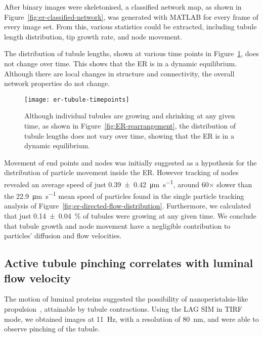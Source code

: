 After binary images were skeletonised, a classified network map, as shown in Figure~\ref{fig:er-classified-network}, was generated with MATLAB for every frame of every image set.
From this, various statistics could be extracted, including tubule length distribution, tip growth rate, and node movement.

The distribution of tubule lengths, shown at various time points in Figure~\ref{fig:er-tubule-timepoints}, does not change over time.
This shows that the ER is in a dynamic equilibrium.
Although there are local changes in structure and connectivity, the overall network properties do not change.

\begin{figure}[b!]
\centering
\texttt{[image: er-tubule-timepoints]}
\caption[ER: Distribution of tubule length remains constant despite growing and shrinking of individual tubules]{Although individual tubules are growing and shrinking at any given time, as shown in Figure~\ref{fig:ER-rearrangement}, the distribution of tubule lengths does not vary over time, showing that the ER is in a dynamic equilibrium. }
\label{fig:er-tubule-timepoints}
\end{figure}

Movement of end points and nodes was initially suggested as a hypothesis for the distribution of particle movement inside the ER.
However tracking of nodes revealed an average speed of just \SI[separate-uncertainty=true]{0.39 \pm 0.42}{\micro\metre\per\second}, around 60$\times$ slower than the \SI{22.9}{\micro\metre\per\second} mean speed of particles found in the single particle tracking analysis of Figure~\ref{fig:er-directed-flow-distribution}.
Furthermore, we calculated that just \SI[separate-uncertainty=true]{0.14 \pm 0.04}{\percent} of tubules were growing at any given time.
We conclude that tubule growth and node movement have a negligible contribution to particles' diffusion and flow velocities.

\subsection{Active tubule pinching correlates with luminal flow velocity}
The motion of luminal proteins suggested the possibility of nanoperistalsis-like propulsion~\cite{nadeem2014mathematical}, attainable by tubule contractions.
Using the LAG SIM in TIRF mode, we obtained images at \SI{11}{\hertz}, with a resolution of \SI{80}{\nano\metre}, and were able to observe pinching of the tubule.

